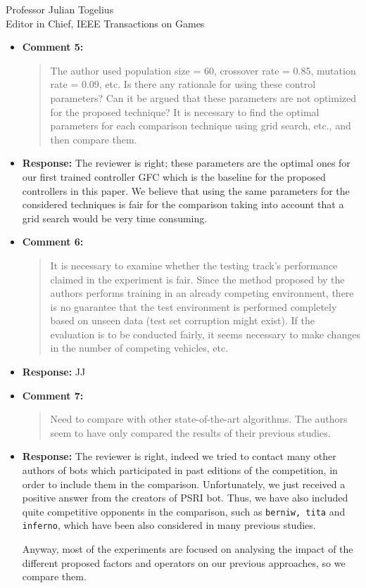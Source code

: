 \documentclass[10pt]{letter} %
\begin{document}
\begin{letter}{Professor Julian Togelius \\ Editor in Chief, IEEE Transactions on Games}
\begin{enumerate}
\begin{itemize}
		\item {\bf Comment 5:}
		\begin{quote}
The author used population size = 60, crossover rate = 0.85, mutation rate = 0.09, etc. Is there any rationale for using these control parameters? Can it be argued that these parameters are not optimized for the proposed technique? It is necessary to find the optimal parameters for each comparison technique using grid search, etc., and then compare them.
			\end{quote}	
		\item {\bf Response:} 
		The reviewer is right; these parameters are the optimal ones for our first trained controller GFC which is the baseline for the proposed controllers in this paper. We believe that using the same parameters for the considered techniques is fair for the comparison taking into account that a grid search would be very time consuming. 
		
		\item {\bf Comment 6:}
		\begin{quote}
It is necessary to examine whether the testing track's performance claimed in the experiment is fair. Since the method proposed by the authors performs training in an already competing environment, there is no guarantee that the test environment is performed completely based on unseen data (test set corruption might exist). If the evaluation is to be conducted fairly, it seems necessary to make changes in the number of competing vehicles, etc.
			\end{quote}	
		\item {\bf Response:} 
		JJ
		\item {\bf Comment 7:}
		\begin{quote}
Need to compare with other state-of-the-art algorithms. The authors seem to have only compared the results of their previous studies.				
			\end{quote}	
		\item {\bf Response:} 
		The reviewer is right, indeed we tried to contact many other authors of bots which participated in past editions of the competition, in order to include them in the comparison. Unfortunately, we just received a positive answer from the creators of PSRI bot. Thus, we have also included quite competitive opponents in the comparison, such as \texttt{berniw, tita} and \texttt{inferno}, which have been also considered in many previous studies.

Anyway, most of the experiments are focused on analysing the impact of the different proposed factors and operators on our previous approaches, so we compare them. 
		

\end{itemize}
\end{enumerate}
\end{letter}
\end{document}

